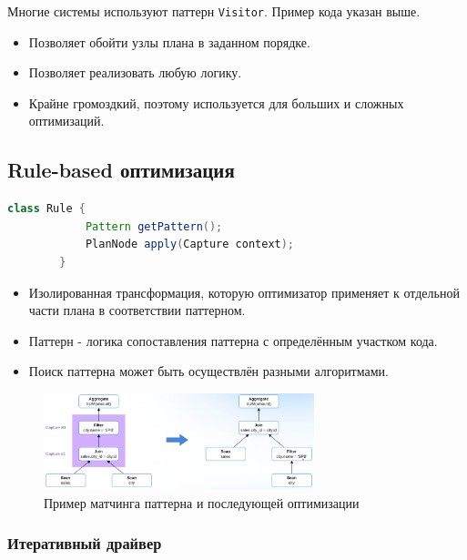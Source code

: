 \documentclass[11pt]{article}
\begin{document}
    Многие системы используют паттерн \texttt{Visitor}.
    Пример кода указан выше.

    \begin{itemize}
        \item Позволяет обойти узлы плана в заданном порядке.
        \item Позволяет реализовать любую логику.
        \item Крайне громоздкий, поэтому используется для больших и сложных оптимизаций.
    \end{itemize}

    \subsection*{Rule-based оптимизация}

    \begin{lstlisting}[language=Java,
        label={lst:rule}]
        class Rule {
            Pattern getPattern();
            PlanNode apply(Capture context);
        }
    \end{lstlisting}

    \begin{itemize}
        \item Изолированная трансформация, которую оптимизатор применяет к отдельной части плана в соответствии паттерном.
        \item Паттерн - логика сопоставления паттерна с определённым участком кода.
        \item Поиск паттерна может быть осуществлён разными алгоритмами.
    \end{itemize}

    \begin{figure}[h!]
        \centering
        \includegraphics[width=0.7\textwidth]{Pictures/Optimisations/Rule-based}
        \caption{Пример матчинга паттерна и последующей оптимизации}
        \label{fig:figure}
    \end{figure}

    \subsubsection*{Итеративный драйвер}
\end{document}
